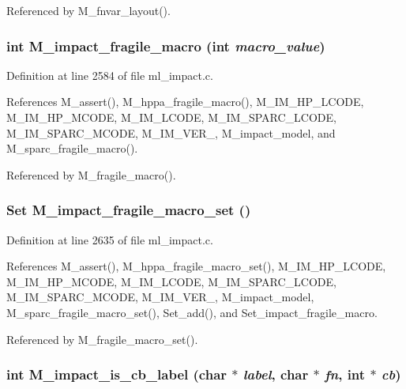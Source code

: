 Referenced by M\_\-fnvar\_\-layout().
\subsubsection{\setlength{\rightskip}{0pt plus 5cm}int M\_\-impact\_\-fragile\_\-macro (int {\em macro\_\-value})}\label{ml__impact_8c_f6abd5dc86b31ff6473ad12f25b0f357}




Definition at line 2584 of file ml\_\-impact.c.

References M\_\-assert(), M\_\-hppa\_\-fragile\_\-macro(), M\_\-IM\_\-HP\_\-LCODE, M\_\-IM\_\-HP\_\-MCODE, M\_\-IM\_\-LCODE, M\_\-IM\_\-SPARC\_\-LCODE, M\_\-IM\_\-SPARC\_\-MCODE, M\_\-IM\_\-VER\_, M\_\-impact\_\-model, and M\_\-sparc\_\-fragile\_\-macro().

Referenced by M\_\-fragile\_\-macro().
\subsubsection{\setlength{\rightskip}{0pt plus 5cm}\bf{Set} M\_\-impact\_\-fragile\_\-macro\_\-set ()}\label{ml__impact_8c_fa6740bce46b3248c44a144e1324a1d5}




Definition at line 2635 of file ml\_\-impact.c.

References M\_\-assert(), M\_\-hppa\_\-fragile\_\-macro\_\-set(), M\_\-IM\_\-HP\_\-LCODE, M\_\-IM\_\-HP\_\-MCODE, M\_\-IM\_\-LCODE, M\_\-IM\_\-SPARC\_\-LCODE, M\_\-IM\_\-SPARC\_\-MCODE, M\_\-IM\_\-VER\_, M\_\-impact\_\-model, M\_\-sparc\_\-fragile\_\-macro\_\-set(), Set\_\-add(), and Set\_\-impact\_\-fragile\_\-macro.

Referenced by M\_\-fragile\_\-macro\_\-set().
\subsubsection{\setlength{\rightskip}{0pt plus 5cm}int M\_\-impact\_\-is\_\-cb\_\-label (char $\ast$ {\em label}, char $\ast$ {\em fn}, int $\ast$ {\em cb})}\label{ml__impact_8c_bd0320b0fe8194d89510f78fa77cb3ac}





